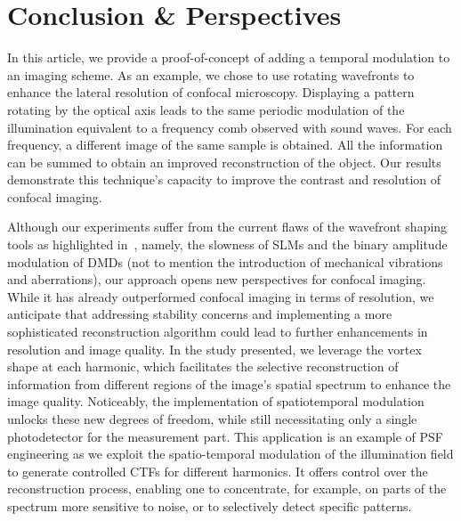 \documentclass[%
reprint,
 amsmath,amssymb,
 aps,
]{revtex4-2}
\begin{document}

\section*{Conclusion \& Perspectives}

In this article, we provide a proof-of-concept of adding a temporal modulation to an imaging scheme. As an example, we chose to use rotating wavefronts to enhance the lateral resolution of confocal microscopy. Displaying a pattern rotating by the optical axis %
leads to the same periodic modulation of the illumination  equivalent to a frequency comb observed with sound waves. For each frequency, a different image of the same sample is obtained. All the information can be summed to obtain an improved reconstruction of the object. Our results demonstrate this technique's capacity to improve the contrast and resolution of confocal imaging. 

Although our experiments suffer from the current flaws of the wavefront shaping tools as highlighted in~\cite{RoadmapStructuredLight}, namely, the slowness of SLMs and the binary amplitude modulation of DMDs (not to mention the introduction of mechanical vibrations and aberrations), our approach opens new perspectives for confocal imaging. 
While it has already outperformed confocal imaging in terms of resolution, 
we anticipate that addressing stability concerns and 
implementing a more sophisticated reconstruction algorithm could lead to 
further enhancements in resolution and image quality. %
In the study presented, we leverage the vortex shape at each harmonic,
which facilitates the selective reconstruction of information 
from different regions of the image's spatial spectrum to enhance the image quality.
Noticeably, the implementation of spatiotemporal modulation 
unlocks these new degrees of freedom, 
while still necessitating only a single photodetector for the measurement part.
This application is an example of PSF engineering 
as we exploit the spatio-temporal modulation of the illumination field 
to generate controlled CTFs for different harmonics.
It offers control over the reconstruction process, 
enabling one to concentrate,
for example, on parts of the spectrum more sensitive to noise, 
or to selectively detect specific patterns.
\end{document}
